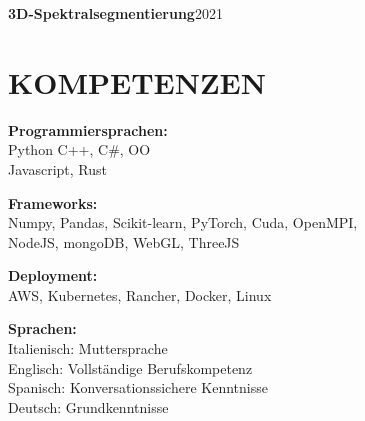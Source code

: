         \resumeProjectHeading
          {\textbf{3D-Spektralsegmentierung}}{2021}
          \resumeItemListStart

          \resumeItemListEnd
    \resumeSubHeadingListEnd


%
\section{KOMPETENZEN}

\begin{minipage}[ht]{0.48\textwidth}
\textbf{Programmiersprachen:} \\
Python C++, C\#, OO \\ Javascript, Rust
\vspace{1em}

\textbf{Frameworks:} \\
Numpy, Pandas, Scikit-learn, PyTorch, Cuda, OpenMPI, \\ 
NodeJS, mongoDB, WebGL, ThreeJS
\end{minipage}
\begin{minipage}[ht]{0.48\textwidth}
\textbf{Deployment:} \\
AWS, Kubernetes, Rancher, Docker, Linux

\vspace{1em}
\textbf{Sprachen:} \\
Italienisch: Muttersprache \\
Englisch: Vollst\"andige Berufskompetenz\\
Spanisch: Konversationssichere Kenntnisse \\
Deutsch: Grundkenntnisse

\end{minipage}



